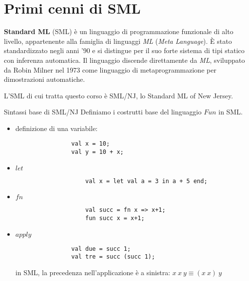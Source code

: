 \documentclass[a4paper,11pt]{report}
\begin{document}
\section{Primi cenni di SML}
\textbf{Standard ML} (SML) è un linguaggio di programmazione funzionale di alto livello, appartenente alla famiglia di linguaggi \textit{ML} (\textit{Meta Language}). È stato standardizzato negli anni ’90 e si distingue per il suo forte sistema di tipi statico con inferenza automatica.
Il linguaggio discende direttamente da \textit{ML}, sviluppato da Robin Milner nel 1973 come linguaggio di metaprogrammazione per dimostrazioni automatiche.

L'SML di cui tratta questo corso è SML/NJ, lo Standard ML of New Jersey.

\begin{defbox}{Sintassi base di SML/NJ}{}
    Definiamo i costrutti base del linguaggio \( Fun \) in SML.

    \begin{itemize}
        \item definizione di una variabile:
            \begin{lstlisting}
                val x = 10;
                val y = 10 + x;
            \end{lstlisting}

            \item \( let \)
                \begin{lstlisting}
                    val x = let val a = 3 in a + 5 end;
                \end{lstlisting}

            \item \( fn \)
                \begin{lstlisting}
                    val succ = fn x => x+1;
                    fun succ x = x+1; 
                \end{lstlisting}

            \item \( apply \)
                \begin{lstlisting}
                val due = succ 1;
                val tre = succ (succ 1);
                \end{lstlisting}
                \begin{gbox}{}
                    in SML, la precedenza nell'applicazione è a sinistra:
                    \( x \ x \ y  \equiv (x \ x) \ y \)
                \end{gbox}
    \end{itemize}

\end{defbox}
\end{document}
